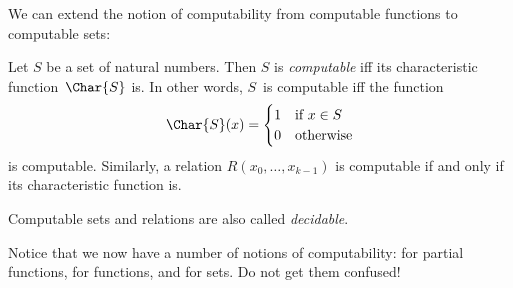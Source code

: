 \documentclass[../../../include/open-logic-section]{subfiles}
\begin{document}

We can extend the notion of computability from computable functions to
computable sets:

\begin{defn}
  Let $S$ be a set of natural numbers. Then $S$ is \emph{computable}
  iff its characteristic function~$\Char{S}$ is. In other words,
  $S$~is computable iff the function
\[
\Char{S}(x) =
\begin{cases}
1 & \text{if $x \in S$} \\
0 & \text{otherwise}
\end{cases}
\]
is computable. Similarly, a relation $R(x_0, \dots, x_{k-1})$ is
computable if and only if its characteristic function is.

Computable sets and relations are also called \emph{decidable}.
\end{defn}

\begin{explain}
Notice that we now have a number of notions of computability: for
partial functions, for functions, and for sets. Do not get them
confused!{} 
\end{explain}
\end{document}
